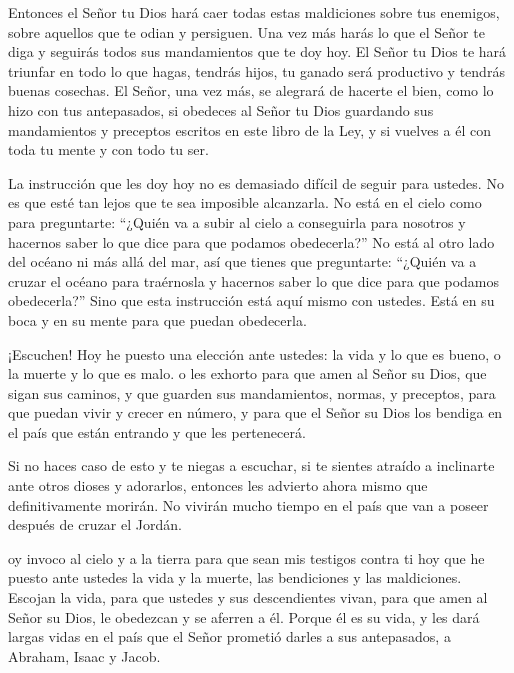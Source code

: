  Entonces el Señor tu Dios hará caer todas estas maldiciones
sobre tus enemigos, sobre aquellos que te odian y persiguen.
 Una vez más harás lo que el Señor te diga y seguirás todos
sus mandamientos que te doy hoy.  El Señor tu Dios te hará
triunfar en todo lo que hagas, tendrás hijos, tu ganado será productivo
y tendrás buenas cosechas. El Señor, una vez más, se alegrará de hacerte
el bien, como lo hizo con tus antepasados,  si obedeces al
Señor tu Dios guardando sus mandamientos y preceptos escritos en este
libro de la Ley, y si vuelves a él con toda tu mente y con todo tu ser.

 La instrucción que les doy hoy no es demasiado difícil de
seguir para ustedes. No es que esté tan lejos que te sea imposible
alcanzarla.  No está en el cielo como para preguntarte:
``¿Quién va a subir al cielo a conseguirla para nosotros y hacernos
saber lo que dice para que podamos obedecerla?''  No está
al otro lado del océano ni más allá del mar, así que tienes que
preguntarte: ``¿Quién va a cruzar el océano para traérnosla y hacernos
saber lo que dice para que podamos obedecerla?''  Sino que
esta instrucción está aquí mismo con ustedes. Está en su boca y en su
mente para que puedan obedecerla.

 ¡Escuchen! Hoy he puesto una elección ante ustedes: la
vida y lo que es bueno, o la muerte y lo que es malo.  o
les exhorto para que amen al Señor su Dios, que sigan sus caminos, y que
guarden sus mandamientos, normas, y preceptos, para que puedan vivir y
crecer en número, y para que el Señor su Dios los bendiga en el país que
están entrando y que les pertenecerá.

 Si no haces caso de esto y te niegas a escuchar, si te
sientes atraído a inclinarte ante otros dioses y adorarlos,
 entonces les advierto ahora mismo que definitivamente
morirán. No vivirán mucho tiempo en el país que van a poseer después de
cruzar el Jordán.

 oy invoco al cielo y a la tierra para que sean mis
testigos contra ti hoy que he puesto ante ustedes la vida y la muerte,
las bendiciones y las maldiciones. Escojan la vida, para que ustedes y
sus descendientes vivan,  para que amen al Señor su Dios,
le obedezcan y se aferren a él. Porque él es su vida, y les dará largas
vidas en el país que el Señor prometió darles a sus antepasados, a
Abraham, Isaac y Jacob.

